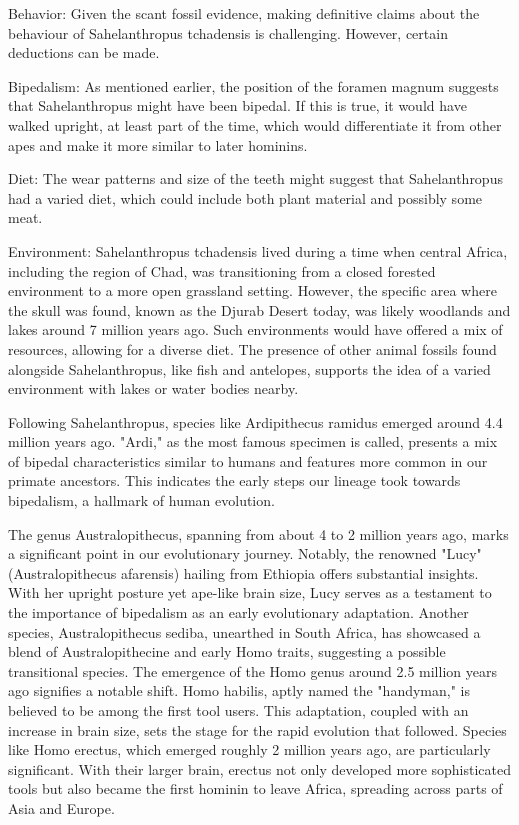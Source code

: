 Behavior:  Given the scant fossil evidence, making definitive claims about the behaviour of Sahelanthropus tchadensis is challenging. However, certain deductions can be made.

Bipedalism: As mentioned earlier, the position of the foramen magnum suggests that Sahelanthropus might have been bipedal. If this is true, it would have walked upright, at least part of the time, which would differentiate it from other apes and make it more similar to later hominins.

Diet: The wear patterns and size of the teeth might suggest that Sahelanthropus had a varied diet, which could include both plant material and possibly some meat.

Environment:  Sahelanthropus tchadensis lived during a time when central Africa, including the region of Chad, was transitioning from a closed forested environment to a more open grassland setting. However, the specific area where the skull was found, known as the Djurab Desert today, was likely woodlands and lakes around 7 million years ago. Such environments would have offered a mix of resources, allowing for a diverse diet. The presence of other animal fossils found alongside Sahelanthropus, like fish and antelopes, supports the idea of a varied environment with lakes or water bodies nearby.

Following Sahelanthropus, species like Ardipithecus ramidus emerged around 4.4 million years ago. "Ardi," as the most famous specimen is called, presents a mix of bipedal characteristics similar to humans and features more common in our primate ancestors. This indicates the early steps our lineage took towards bipedalism, a hallmark of human evolution.

The genus Australopithecus, spanning from about 4 to 2 million years ago, marks a significant point in our evolutionary journey. Notably, the renowned "Lucy" (Australopithecus afarensis) hailing from Ethiopia offers substantial insights. With her upright posture yet ape-like brain size, Lucy serves as a testament to the importance of bipedalism as an early evolutionary adaptation. Another species, Australopithecus sediba, unearthed in South Africa, has showcased a blend of Australopithecine and early Homo traits, suggesting a possible transitional species.
The emergence of the Homo genus around 2.5 million years ago signifies a notable shift. Homo habilis, aptly named the "handyman," is believed to be among the first tool users. This adaptation, coupled with an increase in brain size, sets the stage for the rapid evolution that followed. Species like Homo erectus, which emerged roughly 2 million years ago, are particularly significant. With their larger brain, erectus not only developed more sophisticated tools but also became the first hominin to leave Africa, spreading across parts of Asia and Europe.

